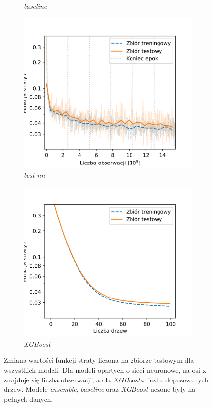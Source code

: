 \documentclass{pracalicmgr}
\begin{document}
\begin{figure}
\begin{subfigure}{.5\textwidth}
	\caption{\textit{baseline}}
	\end{subfigure}
	\begin{subfigure}{.5\textwidth}
	\centering
	\includegraphics[width=1\textwidth]{loss_best-nn.png}
	\caption{\textit{best-nn}}
	\end{subfigure}
	\begin{subfigure}{.5\textwidth}
	\centering
	\includegraphics[width=1\textwidth]{loss_xgb.png}
	\caption{\textit{XGBoost}}
	\end{subfigure}
	\caption{Zmiana wartości funkcji straty liczona na zbiorze testowym dla wszystkich modeli. Dla modeli opartych o sieci neuronowe, na osi x znajduje się liczba obserwacji, a dla \textit{XGBoosta} liczba dopasowanych drzew. Modele \textit{ensemble}, \textit{baseline} oraz \textit{XGBoost} uczone były na pełnych danych.}
	\label{fig:loss}
	\end{figure}	
	
\end{document}
